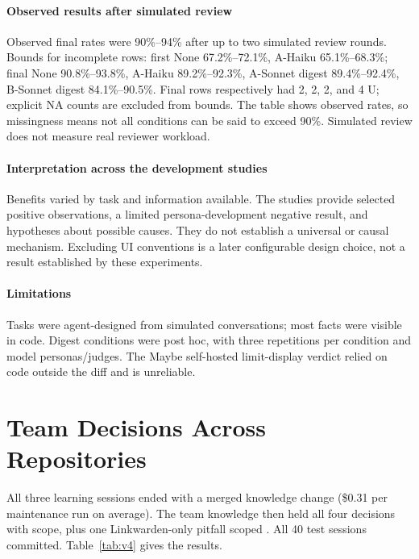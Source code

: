 \paragraph{Observed results after simulated review} Observed final rates were 90\%--94\% after up to two simulated review rounds. Bounds for incomplete rows: first None 67.2\%--72.1\%, A-Haiku 65.1\%--68.3\%; final None 90.8\%--93.8\%, A-Haiku 89.2\%--92.3\%, A-Sonnet digest 89.4\%--92.4\%, B-Sonnet digest 84.1\%--90.5\%. Final rows respectively had 2, 2, 2, and 4 U; explicit NA counts are excluded from bounds. The table shows observed rates, so missingness means not all conditions can be said to exceed 90\%. Simulated review does not measure real reviewer workload.

\paragraph{Interpretation across the development studies} Benefits varied by task and information available. The studies provide selected positive observations, a limited persona-development negative result, and hypotheses about possible causes. They do not establish a universal or causal mechanism. Excluding UI conventions is a later configurable design choice, not a result established by these experiments.

\paragraph{Limitations} Tasks were agent-designed from simulated conversations; most facts were visible in code. Digest conditions were post hoc, with three repetitions per condition and model personas/judges. The Maybe self-hosted limit-display verdict relied on code outside the diff and is unreliable.

\section{Team Decisions Across Repositories}
\label{sec:v4}

All three learning sessions ended with a merged knowledge change (\$0.31 per maintenance run on average). The team knowledge then held all four decisions with  scope, plus one Linkwarden-only pitfall scoped . All 40 test sessions committed. Table~\ref{tab:v4} gives the results.

